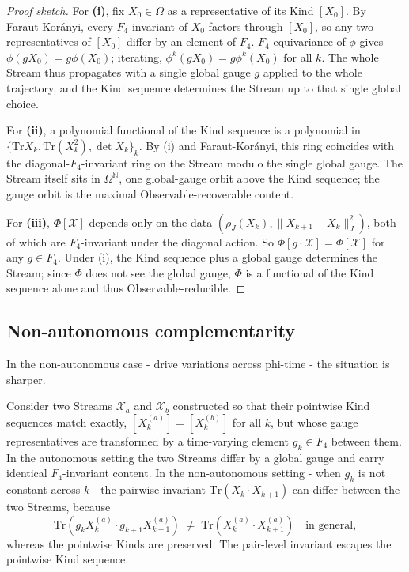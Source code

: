 \documentclass[12pt]{article}
\theoremstyle{remark}
\newcommand{\Ffour}{F_4}
\newcommand{\rhoJ}{\rho_J}
\newcommand{\Phiexp}{\Phi}
\newcommand{\Stream}{\mathcal{X}}
\newcommand{\Tr}{\mathrm{Tr}}
\newcommand{\Jnorm}[1]{\lVert #1 \rVert_J}
\begin{document}
\begin{proof}[Proof sketch]
For \textbf{(i)}, fix $X_0 \in \Omega$ as a representative of its
Kind $[X_0]$. By Faraut-Kor\'anyi, every $\Ffour$-invariant of $X_0$
factors through $[X_0]$, so any two representatives of $[X_0]$
differ by an element of $\Ffour$. $\Ffour$-equivariance of $\phi$
gives $\phi(g X_0) = g \phi(X_0)$; iterating, $\phi^k(g X_0) =
g \phi^k(X_0)$ for all $k$. The whole Stream thus propagates with a
single global gauge $g$ applied to the whole trajectory, and the
Kind sequence determines the Stream up to that single global choice.

For \textbf{(ii)}, a polynomial functional of the Kind sequence is a
polynomial in $\{\Tr X_k, \Tr(X_k^2), \det X_k\}_k$. By (i) and
Faraut-Kor\'anyi, this ring coincides with the diagonal-$\Ffour$-invariant
ring on the Stream modulo the single global gauge. The Stream itself
sits in $\Omega^{\mathbb{N}}$, one global-gauge orbit above the Kind
sequence; the gauge orbit is the maximal Observable-recoverable
content.

For \textbf{(iii)}, $\Phiexp[\Stream]$ depends only on the data
$(\rhoJ(X_k), \Jnorm{X_{k+1} - X_k}^2)$, both of which are
$\Ffour$-invariant under the diagonal action. So
$\Phiexp[g \cdot \Stream] = \Phiexp[\Stream]$ for any
$g \in \Ffour$. Under (i), the Kind sequence plus a global gauge
determines the Stream; since $\Phiexp$ does not see the global gauge,
$\Phiexp$ is a functional of the Kind sequence alone and thus
Observable-reducible.
\end{proof}

\subsection{Non-autonomous complementarity}
\label{sec:non-autonomous-complementarity}

In the non-autonomous case - drive variations across phi-time - the
situation is sharper.

Consider two Streams $\Stream_a$ and $\Stream_b$ constructed so that their
pointwise Kind sequences match exactly,
$[X_k^{(a)}] = [X_k^{(b)}]$ for all $k$, but whose gauge representatives
are transformed by a time-varying element $g_k \in \Ffour$ between them.
In the autonomous setting the two Streams differ by a global gauge and
carry identical $\Ffour$-invariant content. In the non-autonomous setting
- when $g_k$ is not constant across $k$ - the pairwise invariant
$\Tr(X_k \cdot X_{k+1})$ can differ between the two Streams, because
\[
  \Tr(g_k X_k^{(a)} \cdot g_{k+1} X_{k+1}^{(a)})
  \;\neq\; \Tr(X_k^{(a)} \cdot X_{k+1}^{(a)})
  \quad \text{in general},
\]
whereas the pointwise Kinds are preserved. The pair-level invariant
escapes the pointwise Kind sequence.
\end{document}
